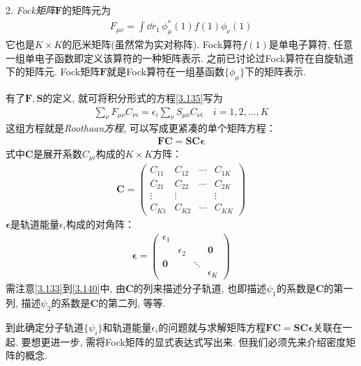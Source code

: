 2. \emph{Fock矩阵$\mathbf{F}$}的矩阵元为
\begin{align}
	F_{\mu\nu} = \int\dd{r}_1\,\phi_\mu^*(1)f(1)\phi_\nu(1)
\end{align}
它也是$K\times K$的厄米矩阵(虽然常为实对称阵). 
Fock算符$f(1)$是单电子算符, 
任意一组单电子函数即定义该算符的一种矩阵表示. 
之前已讨论过Fock算符在自旋轨道下的矩阵元. 
Fock矩阵$\mathbf{F}$就是Fock算符在一组基函数$\{\phi_\mu\}$下的矩阵表示.


有了$\mathbf{F,S}$的定义, 
就可将积分形式的\hft 方程\autoref{3.135}写为
\begin{align}
	\sum_\nu F_{\mu\nu} C_{\nu i} = \epsilon_i\sum_{\nu}S_{\mu\nu}C_{\nu i}\quad i=1,2,\ldots,K
\end{align}
这组方程就是\emph{Roothaan方程}, 
可以写成更紧凑的单个矩阵方程：
\begin{align}
	\label{3.139}
	\mathbf{FC=SC}\bm{\epsilon}
\end{align}
式中$\mathbf{C}$是展开系数$C_{\mu i}$构成的$K\times K$方阵：
\begin{align}
	\label{3.140}
	\mathbf{C} =
	\begin{pmatrix}
		C_{11} & C_{12} & \cdots & C_{1K} \\
		C_{21} & C_{22} & \cdots & C_{2K} \\
		\vdots & \vdots &        & \vdots \\
		C_{K1} & C_{K2} & \cdots & C_{KK}
	\end{pmatrix}
\end{align} 
$\bm{\epsilon}$是轨道能量$\epsilon_i$构成的对角阵：
\begin{align}
	\label{3.141}
	\bm{\epsilon} = 
	\begin{pmatrix}
		\epsilon_1 &            &        &            \\
		& \epsilon_2 &        & \mathbf{0} \\
		\mathbf{0} &            & \ddots &            \\
		&            &        & \epsilon_K
	\end{pmatrix}
\end{align}
需注意\autoref{3.133}到\autoref{3.140}中, 
由$\mathbf{C}$的列来描述分子轨道, 
也即描述$\psi_1$的系数是$\mathbf{C}$的第一列, 
描述$\psi_2$的系数是$\mathbf{C}$的第二列, 
等等.

到此确定\hft 分子轨道$\{\psi_i\}$和轨道能量$\epsilon_i$的问题就与求解矩阵方程$\mathbf{FC=SC}\bm{\epsilon}$关联在一起. 
要想更进一步, 
需将Fock矩阵的显式表达式写出来. 
但我们必须先来介绍密度矩阵的概念.


